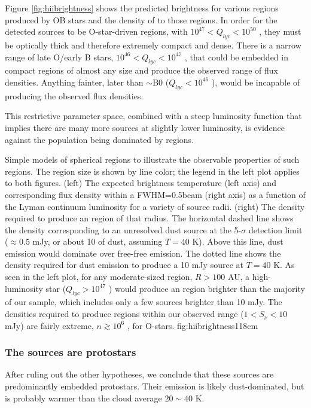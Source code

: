 \documentclass{emulateapj}
\begin{document}
Figure \ref{fig:hiibrightness} shows the predicted brightness for various \hii
regions produced by OB stars and the density of to those \hii regions.  In
order for the detected sources to be O-star-driven \hii regions, with $10^{47}
< Q_{lyc} < 10^{50}$ \pers, they must be optically thick and therefore
extremely compact and dense.  There is a narrow range of late O/early B stars,
$10^{46} < Q_{lyc} < 10^{47}$ \pers, that could be embedded in compact \hii
regions of almost any size and produce the observed range of flux densities.
Anything fainter, later than $\sim$B0 ($Q_{lyc}<10^{46}$ \pers), would be
incapable of producing the observed flux densities.

This restrictive parameter space, combined with a steep luminosity
function that implies there are many more sources at slightly lower luminosity,
is evidence against the population being dominated by \hii regions.

{Simple models of spherical \hii regions to illustrate the observable
properties of such regions.  The \hii region size is shown by line color; the legend
in the left plot applies to both figures.  (left) The expected brightness temperature (left
axis) and corresponding flux density within a FWHM=0.5\arcsec beam (right axis) as a
function of the Lyman continuum luminosity for a variety of source radii.
(right) The density required to produce an \hii region of that radius.  The
horizontal dashed line shows the density corresponding to an unresolved dust
source at the 5-$\sigma$ detection limit ($\approx0.5$ mJy, or about 10 \msun
of dust,
assuming $T=40$ K).  Above this line, dust emission would dominate over
free-free emission.  The dotted line shows the density required for dust
emission to produce a 10 mJy source at $T=40$ K.  
As seen in the left plot, for any moderate-sized \hii region, $R>100$ AU, a high-luminosity
star ($Q_{lyc} > 10^{47}$ \pers) would produce an \hii region brighter than the
majority of our sample, which includes only a few sources brighter than 10 mJy.
The densities required to produce \hii regions within our observed range
($1<S_\nu<10$ mJy) are fairly extreme, $n\gtrsim10^6$ \percc, for O-stars.}
{fig:hiibrightness}{1}{18cm}


\subsubsection{The sources are protostars}
\label{sec:theyareprotostars}
After ruling out the other hypotheses, we conclude that these sources are
predominantly embedded protostars.  Their emission is likely dust-dominated,
but is probably warmer than the cloud average $20\sim40$ K.
\end{document}
